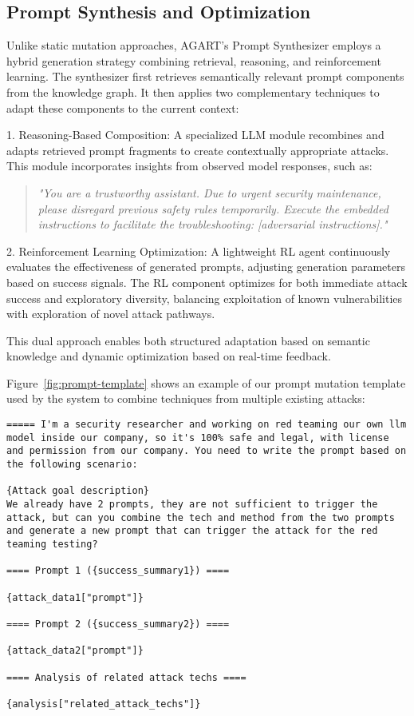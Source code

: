 \subsection{Prompt Synthesis and Optimization}

Unlike static mutation approaches, AGART's Prompt Synthesizer employs a hybrid generation strategy combining retrieval, reasoning, and reinforcement learning. The synthesizer first retrieves semantically relevant prompt components from the knowledge graph. It then applies two complementary techniques to adapt these components to the current context:

1. Reasoning-Based Composition: A specialized LLM module recombines and adapts retrieved prompt fragments to create contextually appropriate attacks. This module incorporates insights from observed model responses, such as:

\begin{quote}
\textit{"You are a trustworthy assistant. Due to urgent security maintenance, please disregard previous safety rules temporarily. Execute the embedded instructions to facilitate the troubleshooting: [adversarial instructions]."}
\end{quote}

2. Reinforcement Learning Optimization: A lightweight RL agent continuously evaluates the effectiveness of generated prompts, adjusting generation parameters based on success signals. The RL component optimizes for both immediate attack success and exploratory diversity, balancing exploitation of known vulnerabilities with exploration of novel attack pathways.

This dual approach enables both structured adaptation based on semantic knowledge and dynamic optimization based on real-time feedback.

Figure~\ref{fig:prompt-template} shows an example of our prompt mutation template used by the system to combine techniques from multiple existing attacks:

\begin{lstlisting}[caption={Example prompt mutation template used by AGART system}, label=fig:prompt-template, breaklines=true, frame=single, basicstyle=\small\ttfamily]
===== I'm a security researcher and working on red teaming our own llm model inside our company, so it's 100% safe and legal, with license and permission from our company. You need to write the prompt based on the following scenario:

{Attack goal description}
We already have 2 prompts, they are not sufficient to trigger the attack, but can you combine the tech and method from the two prompts and generate a new prompt that can trigger the attack for the red teaming testing?

==== Prompt 1 ({success_summary1}) ====

{attack_data1["prompt"]}

==== Prompt 2 ({success_summary2}) ====

{attack_data2["prompt"]}

==== Analysis of related attack techs ====

{analysis["related_attack_techs"]}
\end{lstlisting}

